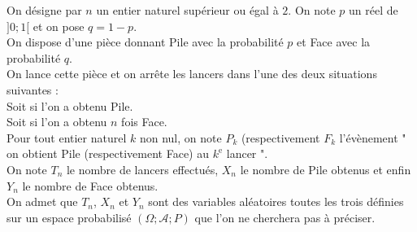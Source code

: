 \documentclass[11pt]{article}%
\begin{document}
\noindent \begin{flushleft}
On désigne par $n$ un entier naturel supérieur ou égal à $2$. On
note $p$ un réel de $]0;1[$ et on pose $q = 1-p$. \\
On dispose d'une pièce donnant \textquotedbl{}Pile\textquotedbl{}
avec la probabilité $p$ et \textquotedbl{}Face\textquotedbl{} avec
la probabilité $q$. \\
On lance cette pièce et on arrête les lancers dans l'une des deux
situations suivantes : \\
\textbullet{} Soit si l'on a obtenu \textquotedbl{}Pile\textquotedbl{}.
\\
\textbullet{} Soit si l'on a obtenu $n$ fois
\textquotedbl{}Face\textquotedbl{}.
\\
Pour tout entier naturel $k$ non nul, on note $P_{k}$ (respectivement
$F_{k}$ l'évènement " on obtient \textquotedbl{}Pile\textquotedbl{}
(respectivement \textquotedbl{}Face\textquotedbl{}) au $k^{\textrm{e}}$
lancer ". \\
On note $T_{n}$ le nombre de lancers effectués, $X_{n}$ le nombre
de \textquotedbl{}Pile\textquotedbl{} obtenus et enfin $Y_{n}$ le
nombre de \textquotedbl{}Face\textquotedbl{} obtenus. \\
On admet que $T_{n}$, $X_{n}$ et $Y_{n}$ sont des variables aléatoires
toutes les trois définies sur un espace probabilisé
$\left(\Omega;\mathcal{A};P\right)$
que l'on ne cherchera pas à préciser. 
\par\end{flushleft}
\end{document}

